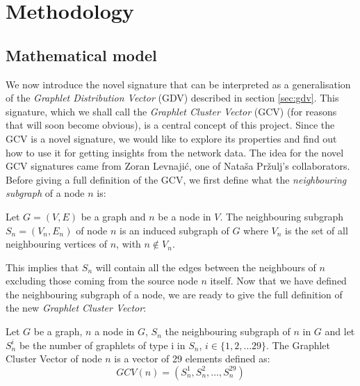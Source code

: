 \chapter{Methodology}
\label{chp:methodology}

\section{Mathematical model}
\label{sec:math_model}

We now introduce the novel signature that can be interpreted as a generalisation of
the \emph{Graphlet Distribution Vector} (GDV) described in section \ref{sec:gdv}. This signature, which we shall call the \emph{Graphlet Cluster Vector} (GCV) (for reasons that will soon become obvious), is a central concept of this project. Since the GCV is a novel signature, we would like to explore its properties and find out how to use it for getting insights from the network data. The idea for the novel GCV signatures came from Zoran Levnaji\'{c}, one of Nata\v{s}a Pr\v{z}ulj's collaborators. Before giving a full definition of the GCV, we first define what the \emph{neighbouring subgraph} of a node $n$ is: 

\begin{mydef}
\label{def:neighbouring_subgraph}
 Let $G = (V,E)$ be a graph and $n$ be a node in $V$. The neighbouring subgraph $S_n=(V_n,E_n)$ of node $n$ is an induced subgraph of $G$ where $V_n$ is the set of all neighbouring vertices of $n$, with $n \notin V_n$.
\end{mydef}

This implies that $S_n$ will contain all the edges between the neighbours of $n$ excluding those coming from the source node $n$ itself. Now that we have defined the neighbouring subgraph of a node, we are ready to give the full definition of the new \emph{Graphlet Cluster Vector}:
\begin{mydef}
\label{def:unnorm_gcv}
 Let $G$ be a graph, $n$ a node in $G$, \( S_n \) the neighbouring subgraph of $n$ in $G$ and let \( S_n^i\) be the number of graphlets of type i in \( S_n \), $i \in \{1,2, \dots 29\}$. The Graphlet Cluster Vector of node $n$ is a vector of 29 elements defined as:
 $$ GCV(n) = \left(S_n^1, S_n^2, \dots , S_n^{29}\right)$$
\end{mydef}

